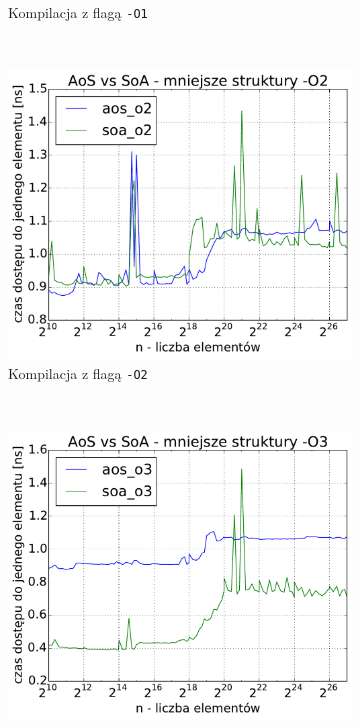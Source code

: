 \begin{figure}
\begin{subfigure}[c]{0.45\textwidth}
        \caption{Kompilacja z flagą \texttt{-O1}}
    \end{subfigure}
    \\
    \vspace{0.55cm}
    \begin{subfigure}[c]{0.45\textwidth}
        \centering
        \includegraphics[width=\textwidth]{images/benchs/compact_aos_vs_soa_O2}
        \caption{Kompilacja z flagą \texttt{-O2}}
    \end{subfigure}
    ~
    \begin{subfigure}[c]{0.45\textwidth}
        \centering
        \includegraphics[width=\textwidth]{images/benchs/compact_aos_vs_soa_O3}

\end{subfigure}
\end{figure}
